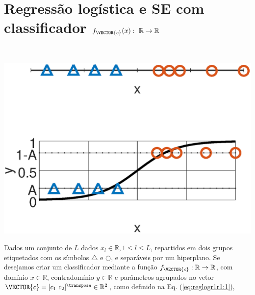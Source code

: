 \newpage

\section{Regressão logística e SE com classificador $f_{\VECTOR{c}}(x):~\mathbb{R} \rightarrow \mathbb{R}$}
\label{sec:theo:reglogr1r1:1}




\begin{theorem}\label{theo:reglogr1r1:1}
~\\
\noindent
\begin{minipage}{0.45\textwidth}
\centering
\includegraphics[width=0.95\linewidth]{chapters/classificacao/mfiles/reglogr1r1/reglogr1r1.eps} 
\end{minipage}
\begin{minipage}{0.55\textwidth}
Dados um conjunto de $L$ dados $x_l \in \mathbb{R}, 1 \leq l \leq L$,
repartidos em dois grupos etiquetados com os símbolos $\bigtriangleup$ e $\bigcirc$, 
e separáveis por um hiperplano.
Se desejamos criar um classificador mediante 
a função  $f_{\VECTOR{c}}:\mathbb{R} \rightarrow \mathbb{R}$,
com domínio $x \in \mathbb{R}$, contradomínio $y \in \mathbb{R}$ e 
parâmetros agrupados no vetor $\VECTOR{c}=[c_1~ c_2]^{\transpose}\in \mathbb{R}^{2}$,
como definido na Eq. (\ref{eq:reglogr1r1:1}),

\end{minipage}
\end{theorem}
